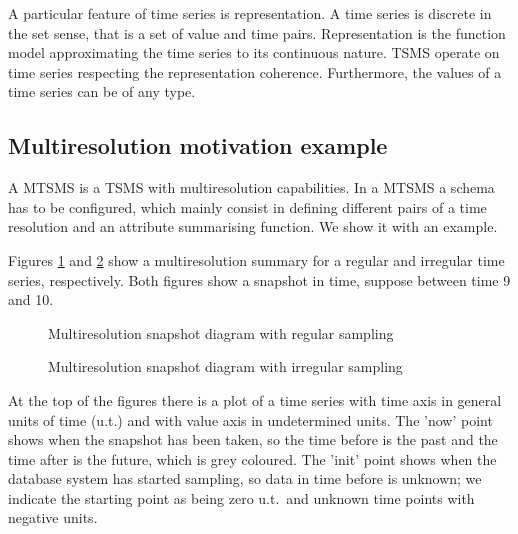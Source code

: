 A particular feature of time series is representation. A time series
is discrete in the set sense, that is a set of value and time
pairs. Representation is the function model approximating the time
series to its continuous nature. TSMS operate on time series
respecting the representation coherence. Furthermore, the values of a
time series can be of any type.





\subsection{Multiresolution motivation example}

A MTSMS is a TSMS with multiresolution capabilities.
In a MTSMS a schema has to be configured, which mainly consist in
defining different pairs of a time resolution and an attribute summarising
function. We show it with an example.

Figures \ref{fig:mtsms:sequence} and
\ref{fig:mtsms:sequence-irregular} show a multiresolution summary for
a regular and irregular time series, respectively. Both figures show a
snapshot in time, suppose between time 9 and 10.


\begin{figure}[tp]
  \centering
  
  \caption{Multiresolution snapshot diagram with regular sampling}
  \label{fig:mtsms:sequence}
\end{figure}


\begin{figure}[tp]
  \centering
  
  \caption{Multiresolution snapshot diagram with irregular sampling}
  \label{fig:mtsms:sequence-irregular}
\end{figure}

At the top of the figures there is a plot of a time series with time
axis in general units of time (u.t.) and with value axis in
undetermined units. The 'now' point shows when the snapshot has been
taken, so the time before is the past and the time after is the
future, which is grey coloured. The 'init' point shows when the
database system has started sampling, so data in time before is
unknown; we indicate the starting point as being zero u.t.\ and unknown
time points with negative units.

